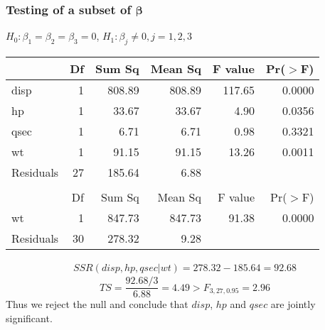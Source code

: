\documentclass[compress]{beamer}
\begin{document}
\begin{frame}[fragile]\frametitle{Testing of a subset of $\boldsymbol{\beta}$}
$H_0:\beta_1=\beta_2=\beta_3=0$, $H_1:\beta_j\ne0,j=1,2,3$\\[0.3cm]
{\scriptsize\begin{table}[ht]
\centering
\begin{tabular}{lrrrrr}
  \hline
 & Df & Sum Sq & Mean Sq & F value & Pr($>$F) \\ 
  \hline
disp & 1 & 808.89 & 808.89 & 117.65 & 0.0000 \\ 
  hp & 1 & 33.67 & 33.67 & 4.90 & 0.0356 \\ 
  qsec & 1 & 6.71 & 6.71 & 0.98 & 0.3321 \\ 
  wt & 1 & 91.15 & 91.15 & 13.26 & 0.0011 \\ 
  Residuals & 27 & 185.64 & 6.88 &  &  \\ 
   \hline\\[0.2cm]


  \hline
 & Df & Sum Sq & Mean Sq & F value & Pr($>$F) \\ 
  \hline
wt & 1 & 847.73 & 847.73 & 91.38 & 0.0000 \\ 
  Residuals & 30 & 278.32 & 9.28 &  &  \\ 
   \hline
\end{tabular}
\end{table}
}

{\small\begin{eqnarray*}
SSR(disp,hp,qsec|wt)=278.32-185.64=92.68
\end{eqnarray*}
\[TS=\frac{92.68/3}{6.88}=4.49>F_{3,27,0.95}=2.96\]
Thus we reject the null and conclude that $disp$, $hp$ and $qsec$ are jointly significant.}
\end{frame}



     
\end{document}
